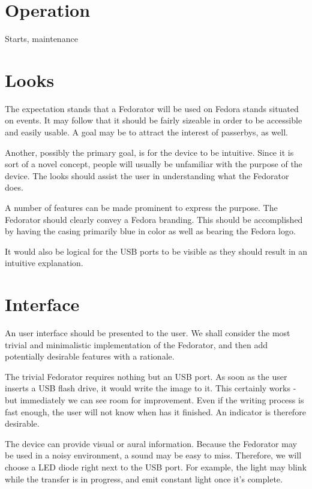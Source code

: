     \section{Operation}
        Starts, maintenance
    \section{Looks}
        The expectation stands that a Fedorator will be used on Fedora stands situated on events.  It may follow that it should be fairly sizeable in order to be accessible and easily usable.  A goal may be to attract the interest of passerbys, as well.
        
        Another, possibly the primary goal, is for the device to be intuitive.  Since it is sort of a novel concept, people will usually be unfamiliar with the purpose of the device.  The looks should assist the user in understanding what the Fedorator does.
        
        A number of features can be made prominent to express the purpose.  The Fedorator should clearly convey a Fedora branding.  This should be accomplished by having the casing primarily blue in color as well as bearing the Fedora logo.
        
        
        It would also be logical for the USB ports to be visible as they should result in an intuitive explanation.
        
    \section{Interface}
        An user interface should be presented to the user.  We shall consider the most trivial and minimalistic implementation of the Fedorator, and then add potentially desirable features with a rationale.
        
        The trivial Fedorator requires nothing but an USB port.  As soon as the user inserts a USB flash drive, it would write the image to it.  This certainly works - but immediately we can see room for improvement.  Even if the writing process is fast enough, the user will not know when has it finished.  An indicator is therefore desirable.
        
        The device can provide visual or aural information.  Because the Fedorator may be used in a noisy environment, a sound may be easy to miss.  Therefore, we will choose a LED diode right next to the USB port.  For example, the light may blink while the transfer is in progress, and emit constant light once it's complete.
        
